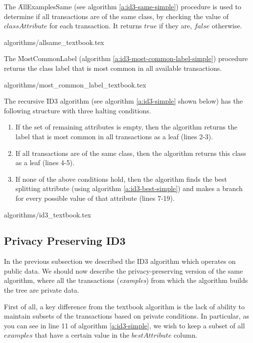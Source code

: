 The \f{AllExamplesSame} (see algorithm \ref{a:id3-same-simple}) procedure is used to determine if all transactions are of the same class, by checking the value of $classAttribute$ for each transaction.
It returns $true$ if they are, $false$ otherwise.

{algorithms/allsame_textbook.tex}

The \f{MostCommonLabel} (algorithm \ref{a:id3-most-common-label-simple}) procedure returns the class label that is most common in all available transactions.

{algorithms/most_common_label_textbook.tex}

The recursive \f{ID3} algorithm (see algorithm \ref{a:id3-simple} shown below) has the following structure with three halting conditions.
\begin{enumerate}
  \item If the set of remaining attributes is empty, then the algorithm returns the label that is most common in all transactions as a leaf (lines 2-3).
  \item If all transactions are of the same class, then the algorithm returns this class as a leaf (lines 4-5).
  \item If none of the above conditions hold, then the algorithm finds the best splitting attribute (using algorithm \ref{a:id3-best-simple}) and makes a branch for every possible value of that attribute (lines 7-19).
\end{enumerate}

{algorithms/id3_textbook.tex}



\subsection{Privacy Preserving ID3}\label{s:pp-id3}


In the previous subsection we described the ID3 algorithm which operates on public data.
We should now describe the privacy\hyp preserving version of the same algorithm, where all the transactions (\textit{examples}) from which the algorithm builds the tree are private data.

First of all, a key difference from the textbook algorithm is the lack of ability to maintain subsets of the transactions based on private conditions.
In particular, as you can see in line 11 of algorithm \ref{a:id3-simple}, we wish to keep a subset of all $examples$ that have a certain value in the $bestAttribute$
 column.

